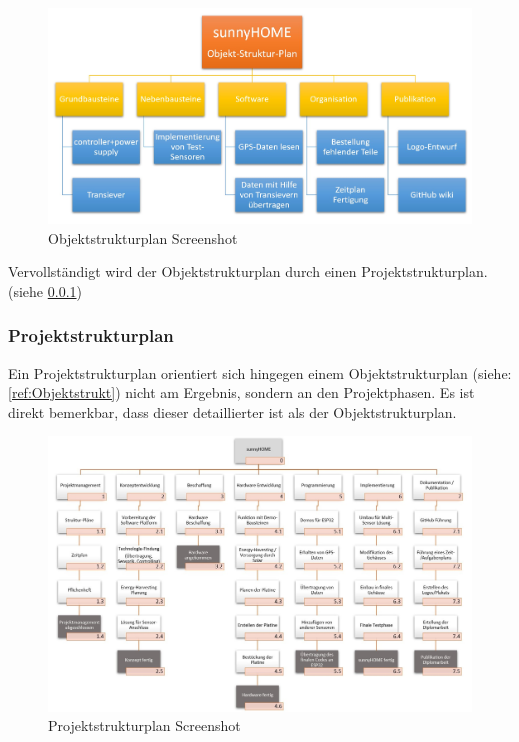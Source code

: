         \begin{figure}[H]
            \centering
            \includegraphics[width=1\textwidth]{./media/images/Objektstrukturplan.jpg}
            \caption{Objektstrukturplan Screenshot}
            \label{fig:Objektstrukt}
        \end{figure}
        
        Vervollständigt wird der Objektstrukturplan durch einen Projektstrukturplan. (siehe \ref{ref:Projektstrukt})
        \begin{flushright}
            \cite{bib:Strukturpl}
        \end{flushright}
        
\pagebreak
        
        \subsubsection{Projektstrukturplan}\label{ref:Projektstrukt}
        
        Ein Projektstrukturplan orientiert sich hingegen einem Objektstrukturplan (siehe: \ref{ref:Objektstrukt}) nicht am Ergebnis, sondern an den Projektphasen. Es ist direkt bemerkbar, dass dieser detaillierter ist als der Objektstrukturplan. 
        
        \begin{figure}[H]
            \centering
            \includegraphics[width=1\textwidth]{./media/images/Projektstrukturplan.jpg}
            \caption{Projektstrukturplan Screenshot}
            \label{fig:Projektstrukt}
        \end{figure}
        

